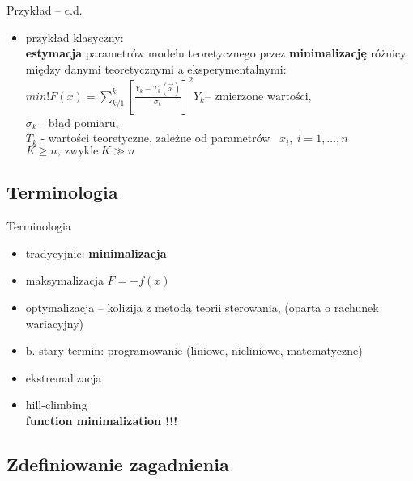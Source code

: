   \begin{frame}
    \begin{exampleblock}{Przykład -- c.d.}
      \begin{itemize}
        \item przykład klasyczny:\\
        \textbf{estymacja} parametrów modelu teoretycznego
        przez \textbf{minimalizację} różnicy między danymi
        teoretycznymi a eksperymentalnymi:\\
        $
          min!F(x) = \sum_{k/1}^{k} \left[ \frac{Y_k - T_k(\vec x)}{\sigma_k}
          \right] ^2 Y_k \text{-- zmierzone wartości,}
        $ \\
        $ \sigma_k $ - błąd pomiaru,\\
        $ T_k $ - wartości teoretyczne, zależne od parametrów~
        $ x_i{,}\ i=1{,} \dots {,}n $ \\
        $ K \geq n{,}\ \text{zwykle}\ K \gg n $
      \end{itemize}
    \end{exampleblock}

  \end{frame}

\subsection{Terminologia}

  \begin{frame}
    \begin{block}{Terminologia}
      \begin{itemize}
        \item tradycyjnie: \textbf{minimalizacja}
        \item maksymalizacja $ F = -f(x)$
        \item optymalizacja -- kolizija z metodą teorii
        sterowania, (oparta o rachunek wariacyjny)
        \item b. stary termin: programowanie (liniowe,
        nieliniowe, matematyczne)
        \item ekstremalizacja
        \item hill-climbing \\
        \textbf{function minimalization !!!}
      \end{itemize}
    \end{block}

  \end{frame}

\subsection{Zdefiniowanie zagadnienia}

